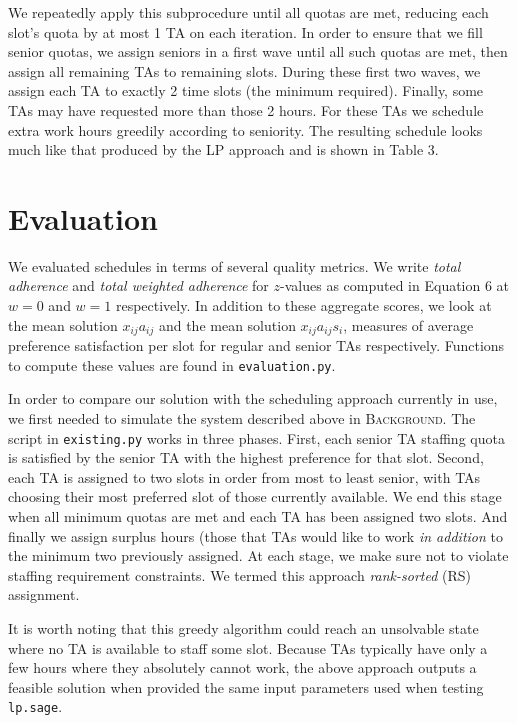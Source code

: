 \documentclass{article}
\begin{document}
\begin{multicols}{2}
We repeatedly apply this subprocedure until all quotas are met, reducing each slot's quota by at most 1 TA on each iteration. In order to ensure that we fill senior quotas, we assign seniors in a first wave until all such quotas are met, then assign all remaining TAs to remaining slots. During these first two waves, we assign each TA to exactly 2 time slots (the minimum required). Finally, some TAs may have requested more than those 2 hours. For these TAs we schedule extra work hours greedily according to seniority. The resulting schedule looks much like that produced by the LP approach and is shown in Table 3.

\section*{Evaluation}

We evaluated schedules in terms of several quality metrics. We write \textit{total adherence} and \textit{total weighted adherence} for $z$-values as computed in Equation 6 at $w = 0$ and $w = 1$ respectively. In addition to these aggregate scores, we look at the mean solution $x_{ij}a_{ij}$ and the mean solution $x_{ij}a_{ij}s_i$, measures of average preference satisfaction per slot for regular and senior TAs respectively. Functions to compute these values are found in \texttt{evaluation.py}.

In order to compare our solution with the scheduling approach currently in use, we first needed to simulate the system described above in \textsc{Background}. The script in \texttt{existing.py} works in three phases. First, each senior TA staffing quota is satisfied by the senior TA with the highest preference for that slot. Second, each TA is assigned to two slots in order from most to least senior, with TAs choosing their most preferred slot of those currently available. We end this stage when all minimum quotas are met and each TA has been assigned two slots. And finally we assign surplus hours (those that TAs would like to work \textit{in addition} to the minimum two previously assigned. At each stage, we make sure not to violate staffing requirement constraints. We termed this approach \textit{rank-sorted} (RS) assignment.

It is worth noting that this greedy algorithm could reach an unsolvable state where no TA is available to staff some slot. Because TAs typically have only a few hours where they absolutely cannot work, the above approach outputs a feasible solution when provided the same input parameters used when testing \texttt{lp.sage}.


\end{multicols}
\end{document}
